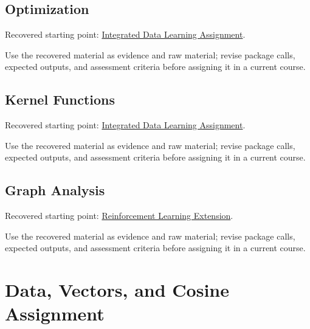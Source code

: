 \documentclass[
  letterpaper,
]{scrbook}
\begin{document}
\section*{Optimization}\label{sec-pr-03-optimization}


Recovered starting point:
\hyperref[sec-lab-integrated-learning-assignment]{Integrated Data
Learning Assignment}.

Use the recovered material as evidence and raw material; revise package
calls, expected outputs, and assessment criteria before assigning it in
a current course.

\section*{Kernel Functions}\label{sec-pr-03-kernel-functions}


Recovered starting point:
\hyperref[sec-lab-integrated-learning-assignment]{Integrated Data
Learning Assignment}.

Use the recovered material as evidence and raw material; revise package
calls, expected outputs, and assessment criteria before assigning it in
a current course.

\section*{Graph Analysis}\label{sec-pr-03-graph-analysis}


Recovered starting point:
\hyperref[sec-lab-reinforcement-learning-extension]{Reinforcement
Learning Extension}.

Use the recovered material as evidence and raw material; revise package
calls, expected outputs, and assessment criteria before assigning it in
a current course.

\chapter*{Data, Vectors, and Cosine
Assignment}\label{ch-lab-data-initialization-assignment}

\end{document}
